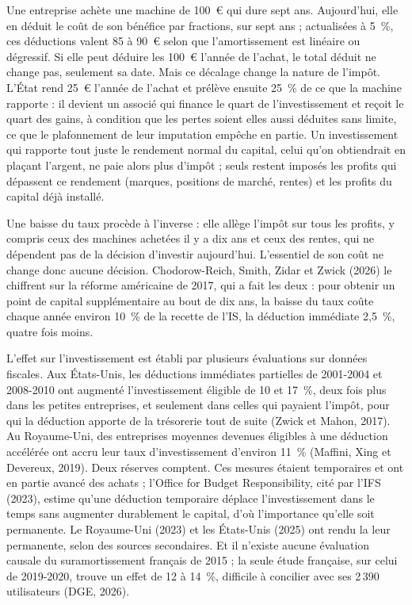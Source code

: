 \documentclass[11pt,a4paper]{article}
\begin{document}
Une entreprise achète une machine de 100~€ qui dure sept ans. Aujourd'hui, elle en déduit le coût de son
bénéfice par fractions, sur sept ans ; actualisées à 5~\%, ces déductions valent 85 à 90~€ selon que
l'amortissement est linéaire ou dégressif. Si elle peut déduire les 100~€ l'année de l'achat, le total
déduit ne change pas, seulement sa date. Mais ce décalage change la nature de l'impôt. L'État rend 25~€
l'année de l'achat et prélève ensuite 25~\% de ce que la machine rapporte : il devient un associé qui finance
le quart de l'investissement et reçoit le quart des gains, à condition que les pertes soient elles aussi
déduites sans limite, ce que le plafonnement de leur imputation empêche en partie. Un investissement qui rapporte tout juste le
rendement normal du capital, celui qu'on obtiendrait en plaçant l'argent, ne paie alors plus d'impôt ; seuls
restent imposés les profits qui dépassent ce rendement (marques, positions de marché, rentes) et les profits
du capital déjà installé.

Une baisse du taux procède à l'inverse : elle allège l'impôt sur tous les profits, y compris ceux des
machines achetées il y a dix ans et ceux des rentes, qui ne dépendent pas de la décision d'investir
aujourd'hui. L'essentiel de son coût ne change donc aucune décision. Chodorow-Reich, Smith, Zidar et Zwick
(2026) le chiffrent sur la réforme américaine de 2017, qui a fait les deux : pour obtenir un point de capital
supplémentaire au bout de dix ans, la baisse du taux coûte chaque année environ 10~\% de la recette de l'IS,
la déduction immédiate 2,5~\%, quatre fois moins.

L'effet sur l'investissement est établi par plusieurs évaluations sur données fiscales. Aux États-Unis, les
déductions immédiates partielles de 2001-2004 et 2008-2010 ont augmenté l'investissement éligible de 10 et
17~\%, deux fois plus dans les petites entreprises, et seulement dans celles qui payaient l'impôt, pour qui la
déduction apporte de la trésorerie tout de suite (Zwick et Mahon, 2017). Au Royaume-Uni, des entreprises
moyennes devenues éligibles à une déduction accélérée ont accru leur taux d'investissement d'environ 11~\%
(Maffini, Xing et Devereux, 2019). Deux réserves comptent. Ces mesures étaient temporaires et ont en partie
avancé des achats ; l'Office for Budget Responsibility, cité par l'IFS (2023), estime qu'une déduction temporaire déplace
l'investissement dans le temps sans augmenter durablement le capital, d'où l'importance qu'elle soit
permanente. Le Royaume-Uni (2023) et les États-Unis (2025) ont rendu la leur permanente, selon des sources
secondaires. Et il n'existe aucune évaluation causale du suramortissement français de 2015 ; la seule étude
française, sur celui de 2019-2020, trouve un effet de 12 à 14~\%, difficile à concilier avec ses 2\,390
utilisateurs (DGE, 2026).
\end{document}
